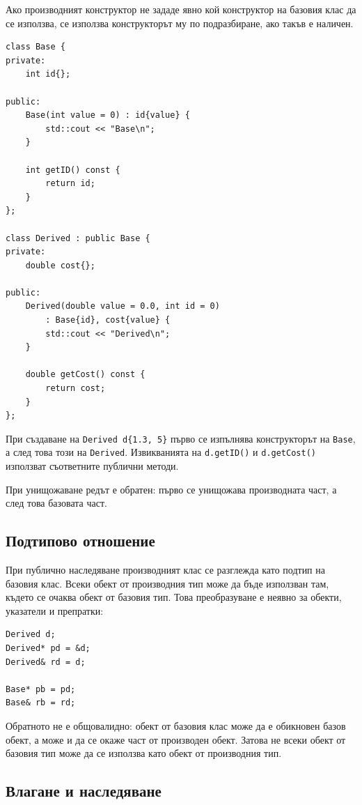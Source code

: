 Ако производният конструктор не зададе явно кой конструктор на базовия клас да се използва, се използва конструкторът му по подразбиране, ако такъв е наличен.

\begin{verbatim}
class Base {
private:
    int id{};

public:
    Base(int value = 0) : id{value} {
        std::cout << "Base\n";
    }

    int getID() const {
        return id;
    }
};

class Derived : public Base {
private:
    double cost{};

public:
    Derived(double value = 0.0, int id = 0)
        : Base{id}, cost{value} {
        std::cout << "Derived\n";
    }

    double getCost() const {
        return cost;
    }
};
\end{verbatim}

При създаване на \texttt{Derived d\{1.3, 5\}} първо се изпълнява конструкторът на \texttt{Base}, а след това този на \texttt{Derived}. Извикванията на \texttt{d.getID()} и \texttt{d.getCost()} използват съответните публични методи.

При унищожаване редът е обратен: първо се унищожава производната част, а след това базовата част.

\subsection{Подтипово отношение}\label{s:16.3.2}

При публично наследяване производният клас се разглежда като подтип на базовия клас. Всеки обект от производния тип може да бъде използван там, където се очаква обект от базовия тип. Това преобразуване е неявно за обекти, указатели и препратки:

\begin{verbatim}
Derived d;
Derived* pd = &d;
Derived& rd = d;

Base* pb = pd;
Base& rb = rd;
\end{verbatim}

Обратното не е общовалидно: обект от базовия клас може да е обикновен базов обект, а може и да се окаже част от производен обект. Затова не всеки обект от базовия тип може да се използва като обект от производния тип.

\subsection{Влагане и наследяване}\label{s:16.3.3}

